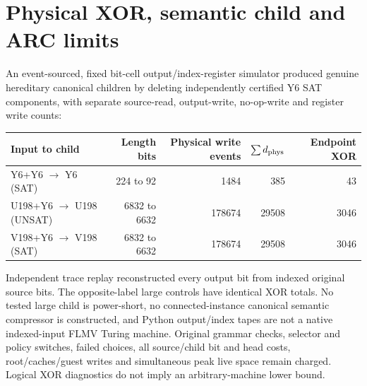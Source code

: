 \documentclass[11pt]{article}
\begin{document}
\section{Physical XOR, semantic child and ARC limits}
An event-sourced, fixed bit-cell output/index-register simulator produced genuine hereditary canonical children by deleting independently certified Y6 SAT components, with separate source-read, output-write, no-op-write and register write counts:
\begin{center}\begin{tabular}{lrrrr}\toprule
Input to child&Length bits&Physical write events&$\sum d_{\rm phys}$&Endpoint XOR\\\midrule
Y6+Y6 $\to$ Y6 (SAT)&224 to 92&1484&385&43\\
U198+Y6 $\to$ U198 (UNSAT)&6832 to 6632&178674&29508&3046\\
V198+Y6 $\to$ V198 (SAT)&6832 to 6632&178674&29508&3046\\\bottomrule\end{tabular}\end{center}
Independent trace replay reconstructed every output bit from indexed original source bits. The opposite-label large controls have identical XOR totals. No tested large child is power-short, no connected-instance canonical semantic compressor is constructed, and Python output/index tapes are not a native indexed-input FLMV Turing machine. Original grammar checks, selector and policy switches, failed choices, all source/child bit and head costs, root/caches/guest writes and simultaneous peak live space remain charged. Logical XOR diagnostics do not imply an arbitrary-machine lower bound.
\end{document}
